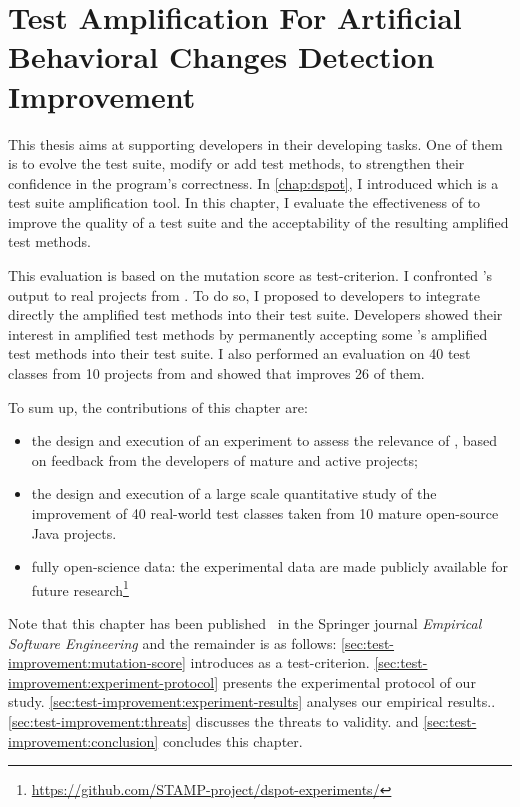 \chapter{Test Amplification For Artificial Behavioral Changes Detection Improvement}
\label{chap:test-improvement}

\minitoc

\graphicspath{{.}{chapitres/test-improvement/}}

This thesis aims at supporting developers in their developing tasks.
One of them is to evolve the test suite, \ie modify or add test methods, to strengthen their confidence in the program's correctness.
In \autoref{chap:dspot}, I introduced \dspot which is a test suite amplification tool.
In this chapter, I evaluate the effectiveness of \dspot to improve the quality of a test suite and the acceptability of the resulting amplified test methods.

This evaluation is based on the mutation score as test-criterion.
I confronted \dspot's output to real projects from \gh.
To do so, I proposed to developers to integrate directly the amplified test methods into their test suite.
Developers showed their interest in amplified test methods by permanently accepting some \dspot's amplified test methods into their test suite.
I also performed an evaluation on 40 test classes from 10 projects from \gh and showed that \dspot improves 26 of them.

To sum up, the contributions of this chapter are:
\begin{itemize}
	\item the design and execution of an experiment to assess the relevance of \dspot, based on feedback from the developers of mature and active projects;
	\item the design and execution of a large scale quantitative study of the improvement of 40 real-world test classes taken from 10 mature open-source Java projects.	
	\item fully open-science data: the experimental data are made publicly available for future research\footnote{\url{https://github.com/STAMP-project/dspot-experiments/}}
\end{itemize}
Note that this chapter has been published~\cite{Danglot2019} in the Springer journal \emph{Empirical Software Engineering} and the remainder is as follows:
\autoref{sec:test-improvement:mutation-score} introduces \ms as a test-criterion.
\autoref{sec:test-improvement:experiment-protocol} presents the experimental protocol of our study.
\autoref{sec:test-improvement:experiment-results} analyses our empirical results..
\autoref{sec:test-improvement:threats} discusses the threats to validity.
and \autoref{sec:test-improvement:conclusion} concludes this chapter.

